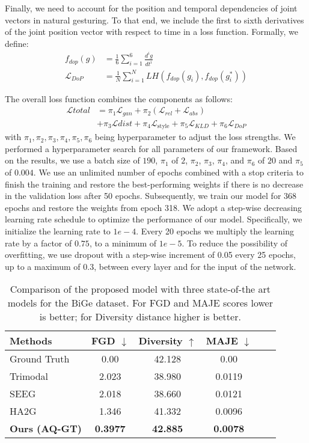 \documentclass[sigconf]{acmart}
\begin{document}
Finally, we need to account for the position and temporal dependencies of joint vectors in natural gesturing. To that end, we include the first to sixth derivatives of the joint position vector with respect to time in a loss function. Formally, we define:
\begin{align} \label{eq:dop}
f_{dop}(g) &= \frac{1}{6} \sum_{i = 1} ^6 \frac{d^ig}{dt^i}\\
\mathcal{L}_{DoP} &= \frac{1}{N} \sum^N_{i=1} LH(f_{dop}(g_i),f_{dop}(g^*_i))
\end{align}

The overall loss function combines the components as follows:
\begin{align}
\mathcal{L}{total} &= \pi_1 \mathcal{L}_{gan} + \pi_2 (\mathcal{L}_{rel}+\mathcal{L}_{abs}) \\
&+ \pi_3 \mathcal{L}{dist} + \pi_4 \mathcal{L}_{\mathrm{style}} + \pi_5 \mathcal{L}_{KLD} + \pi_6 \mathcal{L}_{DoP}
\end{align}
with $\pi_1,\pi_2,\pi_3,\pi_4,\pi_5,\pi_6$ being hyperparameter to adjust the loss strengths. We performed a hyperparameter search for all parameters of our framework. Based on the results, we use a batch size of $190$, $\pi_1$ of $2$, $\pi_2$, $\pi_3$, $\pi_4$, and $\pi_6$ of $20$ and $\pi_5$ of $0.004$. We use an unlimited number of epochs combined with a stop criteria to finish the training and restore the best-performing weights if there is no decrease in the validation loss after 50 epochs. Subsequently, we train our model for 368 epochs and restore the weights from epoch 318. 
We adopt a step-wise decreasing learning rate schedule to optimize the performance of our model. Specifically, we initialize the learning rate to $1e-4$. Every 20 epochs we multiply the learning rate by a factor of $0.75$, to a minimum of $1e-5$. To reduce the possibility of overfitting, we use dropout with a step-wise increment of 0.05 every 25 epochs, up to a maximum of 0.3, between every layer and for the input of the network.

\begin{table}[bt]
    \caption{Comparison of the proposed model with three state-of-the art models for the BiGe dataset. For FGD and MAJE scores lower is better; for Diversity distance higher is better.}
  \centering
  \begin{tabular}{lccccc}
    \toprule
    Methods & FGD $\downarrow$ & Diversity $\uparrow$ & MAJE $\downarrow$\\
    \midrule
    Ground Truth & 0.00 & 42.128 & 0.00\\
    \midrule
     Trimodal \cite{yoonSpeechGestureGeneration2020} & 2.023 & 38.980 & 0.0119\\
     SEEG \cite{liangSEEGSemanticEnergized2022} & 2.018  & 38.660 & 0.0121\\
     HA2G \cite{liuLearningHierarchicalCrossModal2022a}   & 1.346  & 41.332 & 0.0096\\
     \midrule 
     \textbf{Ours (AQ-GT)} & \textbf{0.3977} & \textbf{42.885} & \textbf{0.0078}\\
    \bottomrule
  \end{tabular}
  \label{tbl:res}
\end{table}
\end{document}
